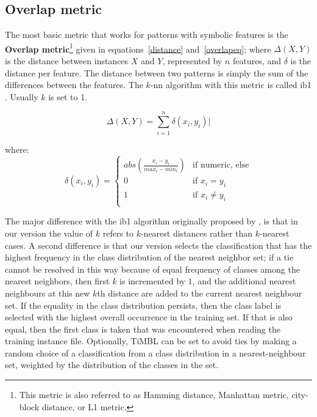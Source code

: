 \documentclass{report}
\begin{document}
\subsection{Overlap metric}
\label{overlap}

The most basic metric that works for patterns with symbolic features
is the {\bf Overlap metric}\footnote{This metric is also referred to
as Hamming distance, Manhattan metric, city-block distance, or L1
metric.} given in equations~\ref{distance} and~\ref{overlapeq}; where
$\Delta(X,Y)$ is the distance between instances $X$ and $Y$,
represented by $n$ features, and $\delta$ is the distance per
feature. The distance between two patterns is simply the sum of the
differences between the features. The $k$-{\sc nn} algorithm with this
metric is called {\sc ib1} \cite{Aha+91}. Usually $k$ is set to 1.

\begin{equation}
\Delta(X,Y) = \sum_{i=1}^{n} \delta(x_{i},y_{i}) |
\label{distance}
\end{equation}

where:
\begin{equation}
\delta(x_{i}, y_{i}) = \left\{ \begin{array}{ll}
		abs(\frac{x_{i}-y_{i}}{max_{i}-min_{i}}) & \mbox{if numeric, else}\\
		0 & \mbox{if $x_{i} = y_{i}$}\\
		1 & \mbox{if $x_{i} \neq y_{i}$}\\
	\end{array} \right.
\label{overlapeq}
\end{equation}

The major difference with the {\sc ib1} algorithm originally proposed
by \cite{Aha+91}, is that in our version the value of $k$ refers to
$k$-nearest distances rather than $k$-nearest cases. A second
difference is that our version selects the classification that has the
highest frequency in the class distribution of the nearest neighbor
set; if a tie cannot be resolved in this way because of equal
frequency of classes among the nearest neighbors, then first $k$ is
incremented by $1$, and the additional nearest neighbours at this new
$k$th distance are added to the current nearest neighbour set. If the
equality in the class distribution persists, then the class label is
selected with the highest overall occurrence in the training set. If
that is also equal, then the first class is taken that was encountered
when reading the training instance file. Optionally, TiMBL can be set
to avoid ties by making a random choice of a classification from a
class distribution in a nearest-neighbour set, weighted by the
distribution of the classes in the set.
\end{document}

